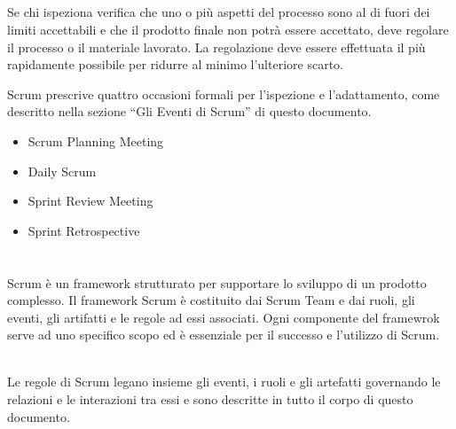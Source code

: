 \subsection*{\color{SteelBlue}{Adattamento}}
\label{sec:adaptation}
Se chi  ispeziona verifica che uno o pi\`u aspetti del processo sono al di fuori dei limiti accettabili  e che il prodotto 
finale non potr\`a essere accettato, deve regolare il processo o il materiale lavorato.  La regolazione  deve essere  effettuata 
il  pi\`u rapidamente possibile per ridurre al minimo l'ulteriore scarto.

Scrum prescrive quattro occasioni formali per l'ispezione e l'adattamento, come descritto nella sezione ``Gli Eventi di Scrum'' 
di questo documento.

\begin{itemize}
     \item Scrum Planning Meeting
     \item Daily Scrum
     \item Sprint Review Meeting
     \item Sprint Retrospective
\end{itemize}


\section*{\color{Blue}{Scrum}}%
\label{sec:scrum}
Scrum \`e un framework strutturato per supportare lo sviluppo di un prodotto complesso. Il framework Scrum \`e costituito dai 
Scrum Team e dai ruoli, gli eventi, gli artifatti e le regole ad essi associati. Ogni componente del framewrok serve ad uno 
specifico scopo ed \`e essenziale per il successo e l'utilizzo di Scrum. \newline

\\ Le regole di Scrum legano insieme gli eventi, i ruoli e gli artefatti governando le relazioni e le interazioni tra essi e 
sono descritte in tutto il corpo di questo documento.
